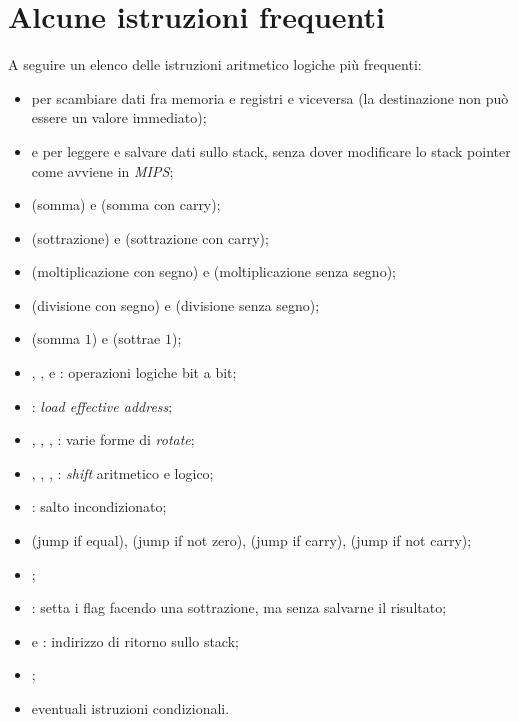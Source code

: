 \documentclass[class=book, crop=false, oneside]{standalone}
\begin{document}
\section{Alcune istruzioni frequenti}
A seguire un elenco delle istruzioni aritmetico logiche più frequenti:
\begin{itemize}
	\item {} per scambiare dati fra memoria e registri e viceversa (la destinazione non può essere un valore immediato);
	\item {} e  per leggere e salvare dati sullo stack, senza dover modificare lo stack pointer come avviene in \emph{MIPS};
	\item {} (somma) e  (somma con carry);
	\item {} (sottrazione) e  (sottrazione con carry);
	\item {} (moltiplicazione con segno) e  (moltiplicazione senza segno);
	\item {} (divisione con segno) e  (divisione senza segno);
	\item {} (somma \(1\)) e  (sottrae \(1\));
	\item {}, ,  e : operazioni logiche bit a bit;
	\item {}: \emph{load effective address};
	\item {}, , , : varie forme di \emph{rotate};
	\item {}, , , : \emph{shift} aritmetico e logico;
	\item {}: salto incondizionato;
	\item {} (jump if equal),  (jump if not zero),  (jump if carry),  (jump if not carry);
	\item {};
	\item {}: setta i flag facendo una sottrazione, ma senza salvarne il risultato;
	\item {} e : indirizzo di ritorno sullo stack;
	\item {};
	\item eventuali istruzioni condizionali.
\end{itemize}
\end{document}
